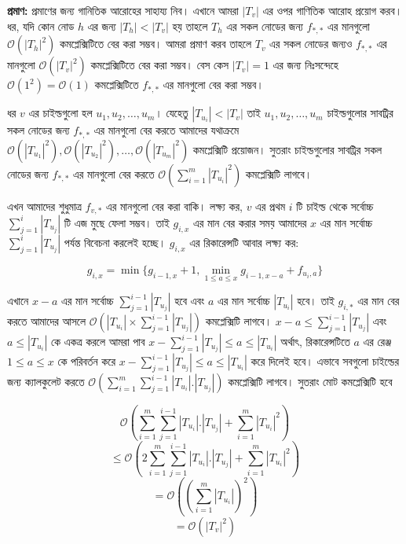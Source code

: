 \textbf{প্রমাণ:}
প্রমাণের জন্য গানিতিক আরোহের সাহায্য নিব। এখানে আমরা \(|T_{v}|\) এর ওপর গাণিতিক আরোহ প্রয়োগ করব। ধর, যদি কোন নোড \(h\) এর জন্য \(|T_{h}| < |T_{v}|\) হয় তাহলে \(T_{h}\) এর সকল নোডের জন্য \(f_{*, *}\) এর মানগুলো \(\mathcal{O}(|T_{h}|^{2})\) কমপ্লেক্সিটিতে বের করা সম্ভব।  আমরা প্রমাণ করব তাহলে \(T_{v}\) এর সকল নোডের জন্যও \(f_{*, *}\) এর মানগুলো \(\mathcal{O}(|T_{v}|^{2})\) কমপ্লেক্সিটিতে বের করা সম্ভব। বেস কেস \(|T_{v}| = 1\) এর জন্য নিঃসন্দেহে \(\mathcal{O} (1^{2}) = \mathcal{O} (1)\) কমপ্লেক্সিটিতে \(f_{*, *}\) এর মানগুলো বের করা সম্ভব।  

ধর \(v\) এর চাইল্ডগুলো হল \(u_{1}, u_{2}, \dots, u_{m}\)। যেহেতু \(|T_{u_{i}}| < |T_{v}|\) তাই \(u_{1}, u_{2}, \dots, u_{m}\) চাইল্ডগুলোর সাবট্রির সকল নোডের জন্য \(f_{*, *}\) এর মানগুলো বের করতে আমাদের যথাক্রমে \(\mathcal{O} (|T_{u_{1}}|^{2}), \mathcal{O} (|T_{u_{2}}|^{2}), \dots, \mathcal{O} (|T_{u_{m}}|^{2})\) কমপ্লেক্সিটি প্রয়োজন। সুতরাং চাইল্ডগুলোর সাবট্রির সকল নোডের জন্য \(f_{*, *}\) এর মানগুলো বের করতে \(\mathcal{O} \left ( \sum_{i = 1}^{m} |T_{u_{i}}|^{2} \right )\) কমপ্লেক্সিটি লাগবে। 

এখন আমাদের শুধুমাত্র \(f_{v, *}\) এর মানগুলো বের করা বাকি। লক্ষ্য কর, \(v\) এর প্রথম \(i\) টি চাইল্ড থেকে সর্বোচ্চ \(\sum_{j = 1}^{i} |T_{u_{j}}|\) টি এজ মুছে ফেলা সম্ভব। তাই \(g_{i, x}\) এর মান বের করার সময় আমাদের \(x\) এর মান সর্বোচ্চ \(\sum_{j = 1}^{i} |T_{u_{j}}|\) পর্যন্ত বিবেচনা করলেই হচ্ছে। \(g_{i, x}\) এর রিকারেন্সটি আবার লক্ষ্য কর:

\[g_{i, x} = \min \lbrace g_{i - 1, x} + 1, \min_{1 \leq a \leq x} g_{i - 1, x - a} + f_{u_{i}, a} \rbrace\]

এখানে \(x - a\) এর মান সর্বোচ্চ \(\sum_{j = 1}^{i - 1} |T_{u_{j}}|\) হবে এবং \(a\) এর মান সর্বোচ্চ \(|T_{u_{i}}|\) হবে। তাই \(g_{i, *}\) এর মান বের করতে আমাদের আসলে \(\mathcal{O} \left( |T_{u_{i}}| \times \sum_{j = 1}^{i - 1} |T_{u_{j}}|\right) \) কমপ্লেক্সিটি লাগবে। \(x - a \leq \sum_{j = 1}^{i - 1} |T_{u_{j}}|\) এবং \(a \leq |T_{u_{i}}|\) কে একত্র করলে আমরা পাব \(x - \sum_{j = 1}^{i - 1} |T_{u_{j}}| \leq a \leq |T_{u_{i}}|\) অর্থাৎ, রিকারেন্সটিতে \(a\) এর রেঞ্জ \(1 \leq a \leq x\) কে পরিবর্তন করে \(x - \sum_{j = 1}^{i - 1} |T_{u_{j}}| \leq a \leq |T_{u_{i}}|\)  করে দিলেই হবে। এভাবে সবগুলো চাইল্ডের জন্য ক্যালকুলেট করতে \(\mathcal{O} \left ( \sum_{i = 1}^{m} \sum_{j = 1}^{i - 1} |T_{u_{i}}|.|T_{u_{j}}| \right ) \) কমপ্লেক্সিটি লাগবে। সুতরাং মোট কমপ্লেক্সিটি হবে

\[\mathcal{O} \left ( \sum_{i = 1}^{m} \sum_{j = 1}^{i - 1} |T_{u_{i}}|.|T_{u_{j}}| + \sum_{i = 1}^{m} |T_{u_{i}}|^{2} \right )\]
\[\leq \mathcal{O} \left ( 2 \sum_{i = 1}^{m} \sum_{j = 1}^{i - 1} |T_{u_{i}}|.|T_{u_{j}}| + \sum_{i = 1}^{m} |T_{u_{i}}|^{2} \right )\]
\[= \mathcal{O} \left ( \left ( \sum_{i = 1}^{m} |T_{u_{i}}| \right ) ^ {2} \right )\]
\[= \mathcal{O} \left ( |T_{v}| ^ {2} \right )\]


